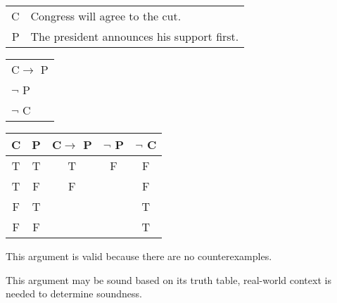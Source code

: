 \section{}
\centering
\begin{tabular}{r l}
    C & Congress will agree to the cut. \\
    P & The president announces his support first.
\end{tabular}
\begin{tabular}{l}
    C$\rightarrow$ P\\
    $\lnot$ P\\
    \hline
    $\lnot$ C
\end{tabular}

\begin{tabular}{c|c||c|c||c}
    C & P & C$\rightarrow$ P & $\lnot$ P & $\lnot$ C \\
    \hline
    T & T & T & F & F \\
    T & F & F &   & F \\
    F & T &   &   & T \\
    F & F &   &   & T
\end{tabular}

\justifying
\noindent This argument is valid because there are no counterexamples.

\noindent This argument may be sound based on its truth table, real-world context is needed to determine soundness.